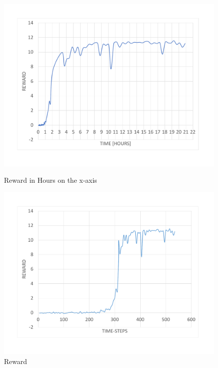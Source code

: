 \begin{figure}[H]
	\advance\leftskip-4cm
	\includegraphics[width=\linewidth]{Figures/Result/reward_in_hours_best.pdf}
	\caption{Reward in Hours on the x-axis}\label{fig:RewardHours}
	\endminipage\hfill
	\includegraphics[width=\textwidth]{Figures/Reward}
	\caption{Reward}
	\label{fig:Reward}
	\endminipage
\end{figure}
